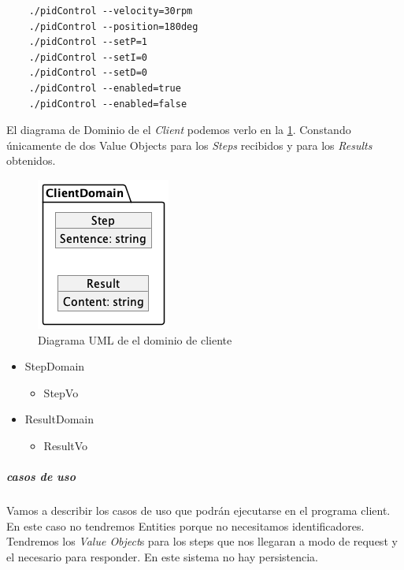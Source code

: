 \begin{verbatim}
    ./pidControl --velocity=30rpm
    ./pidControl --position=180deg
    ./pidControl --setP=1
    ./pidControl --setI=0
    ./pidControl --setD=0
    ./pidControl --enabled=true
    ./pidControl --enabled=false
\end{verbatim}

El diagrama de Dominio de el \textit{Client} podemos verlo en la \cref{fig:Diagrama UML de el dominio de cliente}. Constando únicamente de dos Value Objects para los \textit{Steps} recibidos y para los \textit{Results} obtenidos.

\begin{figure}[H]
    \centering
    \includegraphics[height=0.2\textheight]{./part/Proyecto_ejecutivo/memoria_descriptiva/descripcionDelProyecto/client/uml/clientDomain}
    \caption{Diagrama UML de el dominio de cliente}\label{fig:Diagrama UML de el dominio de cliente}
\end{figure}

\begin{itemize}
    \item StepDomain
    \begin{itemize}
        \item StepVo
    \end{itemize}
    \item ResultDomain
    \begin{itemize}
        \item ResultVo
    \end{itemize}
\end{itemize}

\subparagraph{casos de uso}

Vamos a describir los casos de uso que podrán ejecutarse en el programa client. En este caso no tendremos Entities porque no necesitamos identificadores.
Tendremos los \textit{Value Object}s para los steps que nos llegaran a modo de request y el necesario para responder. En este sistema no hay persistencia.

